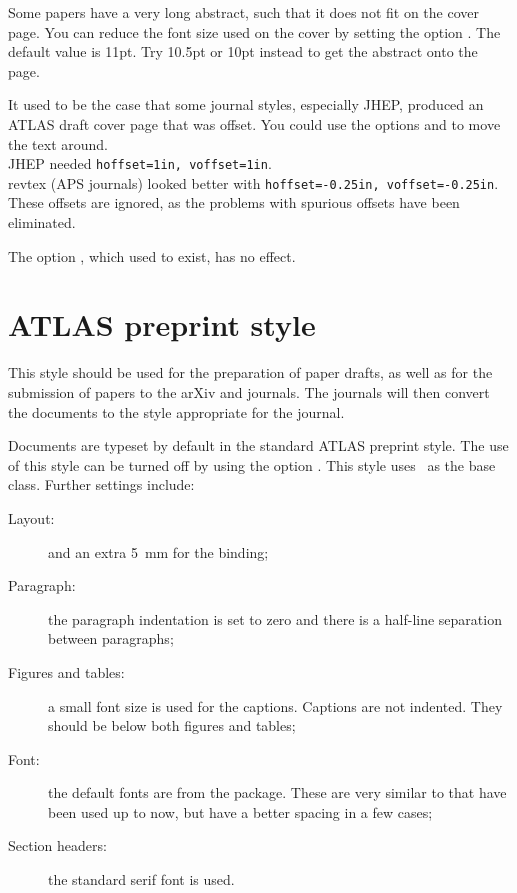 Some papers have a very long abstract, such that it does not fit on the cover page.
You can reduce the font size used on the cover by setting the option .
The default value is 11pt. Try 10.5pt or 10pt instead to get the abstract onto the page.

It used to be the case that some journal styles, especially JHEP,
produced an ATLAS draft cover page that was offset.
You could use the options  and  to move the text around.\\
JHEP needed \verb|hoffset=1in, voffset=1in|.\\
revtex (APS journals) looked better with  \verb|hoffset=-0.25in, voffset=-0.25in|.\\
 These offsets are ignored,
as the problems with spurious offsets have been eliminated.

The option , which used to exist, has no effect.


\section{ATLAS preprint style}
\label{sec:atlasstyle}

This style should be used for the preparation of paper drafts,
as well as for the submission of papers to the arXiv and journals.
The journals will then convert the documents to the style appropriate for the journal.

Documents are typeset by default in the standard ATLAS preprint style.
The use of this style can be turned off by using the option
.
This style uses \KOMAScript\ as the base class.
Further settings include:
\begin{description}
\item[Layout:]  and an extra \qty{5}{\mm} for the binding;
\item[Paragraph:] the paragraph indentation is set to zero and 
  there is a half-line separation between paragraphs;
\item[Figures and tables:] a small font size is used for the captions.
  Captions are not indented.
  They should be below both figures and tables;
\item[Font:] the default fonts are from the  package.
  These are very similar to  that have been used up to now,
  but have a better spacing in a few cases;
\item[Section headers:] the standard serif font is used.
\end{description}

